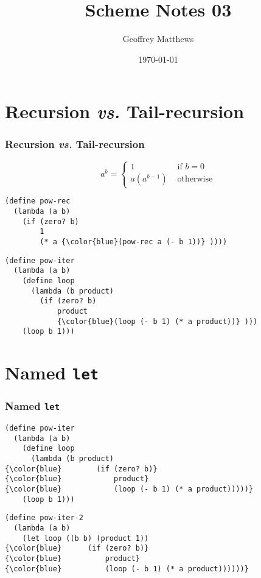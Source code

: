 \documentclass{beamer}
\title
{
Scheme Notes 03
}
\subtitle{
} %
\author[Geoffrey Matthews]
{Geoffrey Matthews}
\institute[WWU/CS]
{
  Department of Computer Science\\
  Western Washington University
}
\date{\today}
\newcommand{\sect}[1]{
\section{#1}
\begin{frame}[fragile]\frametitle{#1}
}
\begin{document}
\begin{frame}
  \titlepage
\end{frame}


\newcommand{\myref}[1]{\small\item\url{#1}}
\newcommand{\myreft}[1]{\footnotesize\item\url{#1}}


\sect{Recursion {\em vs.} Tail-recursion}

\[ a^b = \left\{\begin{array}{ll} 1 & \mbox{ if $b=0$}\\
    a(a^{b-1}) & \mbox{ otherwise}
  \end{array}\right.
  \]

\begin{Verbatim}[commandchars=\\\{\}]
(define pow-rec
  (lambda (a b)
    (if (zero? b) 
        1
        (* a {\color{blue}(pow-rec a (- b 1))} ))))
\end{Verbatim}
\vfill\pause

\begin{Verbatim}[commandchars=\\\{\}]
(define pow-iter
  (lambda (a b)
    (define loop
      (lambda (b product)
        (if (zero? b)
            product
            {\color{blue}(loop (- b 1) (* a product))} )))
    (loop b 1)))
\end{Verbatim}
\end{frame}

\sect{Named {\tt let}}

\begin{Verbatim}[commandchars=\\\{\}]
(define pow-iter
  (lambda (a b)
    (define loop
      (lambda (b product)
{\color{blue}        (if (zero? b)}
{\color{blue}            product}
{\color{blue}            (loop (- b 1) (* a product)))))}
    (loop b 1)))
\end{Verbatim}
\vfill
\begin{Verbatim}[commandchars=\\\{\}]
(define pow-iter-2
  (lambda (a b)
    (let loop ((b b) (product 1))
{\color{blue}      (if (zero? b)}
{\color{blue}          product}
{\color{blue}          (loop (- b 1) (* a product))))))}
\end{Verbatim}
\end{frame}
\end{document}

